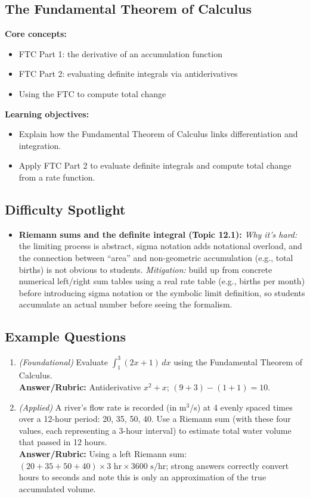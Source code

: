 \documentclass{article}
\begin{document}
\subsection{The Fundamental Theorem of Calculus}
\textbf{Core concepts:}
\begin{itemize}[leftmargin=*]
  \item FTC Part 1: the derivative of an accumulation function
  \item FTC Part 2: evaluating definite integrals via antiderivatives
  \item Using the FTC to compute total change
\end{itemize}
\textbf{Learning objectives:}
\begin{itemize}[leftmargin=*]
  \item Explain how the Fundamental Theorem of Calculus links differentiation and integration.
  \item Apply FTC Part 2 to evaluate definite integrals and compute total change from a rate function.
\end{itemize}

\subsection*{Difficulty Spotlight}
\begin{itemize}[leftmargin=*]
  \item \textbf{Riemann sums and the definite integral (Topic 12.1):} \textit{Why it's hard:} the limiting process is abstract, sigma notation adds notational overload, and the connection between ``area'' and non-geometric accumulation (e.g., total births) is not obvious to students. \textit{Mitigation:} build up from concrete numerical left/right sum tables using a real rate table (e.g., births per month) before introducing sigma notation or the symbolic limit definition, so students accumulate an actual number before seeing the formalism.
\end{itemize}

\subsection*{Example Questions}
\begin{enumerate}[leftmargin=*]
  \item \textit{(Foundational)} Evaluate $\displaystyle\int_1^3 (2x+1)\,dx$ using the Fundamental Theorem of Calculus. \\
  \textbf{Answer/Rubric:} Antiderivative $x^2+x$; $(9+3)-(1+1)=10$.
  \item \textit{(Applied)} A river's flow rate is recorded (in m$^3$/s) at 4 evenly spaced times over a 12-hour period: 20, 35, 50, 40. Use a Riemann sum (with these four values, each representing a 3-hour interval) to estimate total water volume that passed in 12 hours. \\
  \textbf{Answer/Rubric:} Using a left Riemann sum: $(20+35+50+40)\times 3\text{ hr} \times 3600\text{ s/hr}$; strong answers correctly convert hours to seconds and note this is only an approximation of the true accumulated volume.
\end{enumerate}
\end{document}
